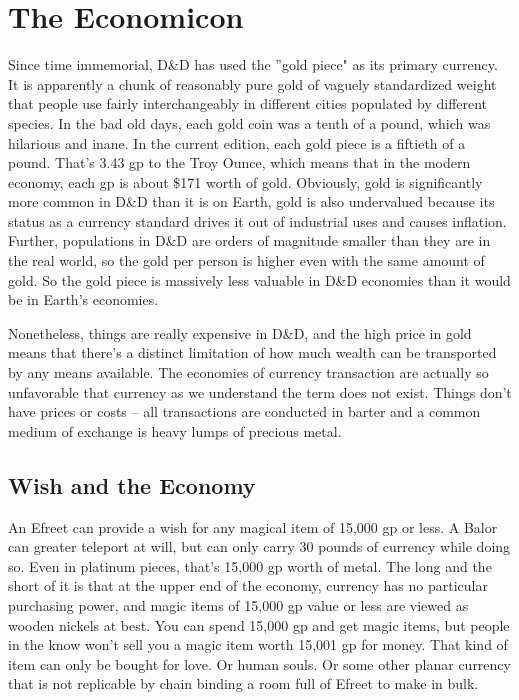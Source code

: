 
\section{The Economicon} %
\vspace*{-10pt}

Since time immemorial, D\&D has used the ''gold piece" as its primary currency. It is apparently a chunk of reasonably pure gold of vaguely standardized weight that people use fairly interchangeably in different cities populated by different species. In the bad old days, each gold coin was a tenth of a pound, which was hilarious and inane. In the current edition, each gold piece is a fiftieth of a pound. That's 3.43 gp to the Troy Ounce, which means that in the modern economy, each gp is about \$171 worth of gold. Obviously, gold is significantly more common in D\&D than it is on Earth, gold is also undervalued because its status as a currency standard drives it out of industrial uses and causes inflation. Further, populations in D\&D are orders of magnitude smaller than they are in the real world, so the gold per person is higher even with the same amount of gold. So the gold piece is massively less valuable in D\&D economies than it would be in Earth's economies.

Nonetheless, things are really expensive in D\&D, and the high price in gold means that there's a distinct limitation of how much wealth can be transported by any means available. The economies of currency transaction are actually so unfavorable that currency as we understand the term does not exist. Things don't have prices or costs -- all transactions are conducted in barter and a common medium of exchange is heavy lumps of precious metal.

\subsection{Wish and the Economy}

An Efreet can provide a wish for any magical item of 15,000 gp or less. A Balor can greater teleport at will, but can only carry 30 pounds of currency while doing so. Even in platinum pieces, that's 15,000 gp worth of metal. The long and the short of it is that at the upper end of the economy, currency has no particular purchasing power, and magic items of 15,000 gp value or less are viewed as wooden nickels at best. You can spend 15,000 gp and get magic items, but people in the know won't sell you a magic item worth 15,001 gp for money. That kind of item can only be bought for love. Or human souls. Or some other planar currency that is not replicable by chain binding a room full of Efreet to make in bulk.

